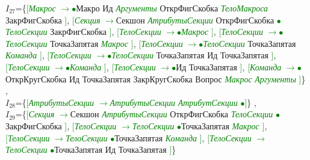 \documentclass[a0]{a0poster}
\begin{document}
$I_{27}$=\{\textcolor{Green}{[}\textcolor{Green}{\textit{Макрос}} \textcolor{Green}{$\to$}\textcolor{Green}{$\bullet$}Макро Ид \textcolor{Green}{\textit{Аргументы}} ОткрФигСкобка \textcolor{Green}{\textit{ТелоМакроса}} ЗакрФигСкобка \textcolor{Green}{]}, \textcolor{Green}{[}\textcolor{Green}{\textit{Секция}} \textcolor{Green}{$\to$}Секшон \textcolor{Green}{\textit{АтрибутыСекции}} ОткрФигСкобка \textcolor{Green}{$\bullet$}\textcolor{Green}{\textit{ТелоСекции}} ЗакрФигСкобка \textcolor{Green}{]}, \textcolor{Green}{[}\textcolor{Green}{\textit{ТелоСекции}} \textcolor{Green}{$\to$}\textcolor{Green}{$\bullet$}\textcolor{Green}{\textit{Макрос}} \textcolor{Green}{]}, \textcolor{Green}{[}\textcolor{Green}{\textit{ТелоСекции}} \textcolor{Green}{$\to$}\textcolor{Green}{$\bullet$}\textcolor{Green}{\textit{ТелоСекции}} ТочкаЗапятая \textcolor{Green}{\textit{Макрос}} \textcolor{Green}{]}, \textcolor{Green}{[}\textcolor{Green}{\textit{ТелоСекции}} \textcolor{Green}{$\to$}\textcolor{Green}{$\bullet$}\textcolor{Green}{\textit{ТелоСекции}} ТочкаЗапятая \textcolor{Green}{\textit{Команда}} \textcolor{Green}{]}, \textcolor{Green}{[}\textcolor{Green}{\textit{ТелоСекции}} \textcolor{Green}{$\to$}\textcolor{Green}{$\bullet$}\textcolor{Green}{\textit{ТелоСекции}} ТочкаЗапятая Ид ТочкаЗапятая \textcolor{Green}{]}, \textcolor{Green}{[}\textcolor{Green}{\textit{ТелоСекции}} \textcolor{Green}{$\to$}\textcolor{Green}{$\bullet$}\textcolor{Green}{\textit{Команда}} \textcolor{Green}{]}, \textcolor{Green}{[}\textcolor{Green}{\textit{ТелоСекции}} \textcolor{Green}{$\to$}\textcolor{Green}{$\bullet$}Ид ТочкаЗапятая \textcolor{Green}{]}, \textcolor{Green}{[}\textcolor{Green}{\textit{Команда}} \textcolor{Green}{$\to$}\textcolor{Green}{$\bullet$}ОткрКругСкобка Ид ТочкаЗапятая ЗакрКругСкобка Вопрос \textcolor{Green}{\textit{Макрос}} \textcolor{Green}{\textit{Аргументы}} \textcolor{Green}{]}\}
,\\
$I_{28}$=\{\textcolor{Green}{[}\textcolor{Green}{\textit{АтрибутыСекции}} \textcolor{Green}{$\to$}\textcolor{Green}{\textit{АтрибутыСекции}} \textcolor{Green}{\textit{АтрибутСекции}} \textcolor{Green}{$\bullet$}\textcolor{Green}{]}\}
,\\
$I_{29}$=\{\textcolor{Green}{[}\textcolor{Green}{\textit{Секция}} \textcolor{Green}{$\to$}Секшон \textcolor{Green}{\textit{АтрибутыСекции}} ОткрФигСкобка \textcolor{Green}{\textit{ТелоСекции}} \textcolor{Green}{$\bullet$}ЗакрФигСкобка \textcolor{Green}{]}, \textcolor{Green}{[}\textcolor{Green}{\textit{ТелоСекции}} \textcolor{Green}{$\to$}\textcolor{Green}{\textit{ТелоСекции}} \textcolor{Green}{$\bullet$}ТочкаЗапятая \textcolor{Green}{\textit{Макрос}} \textcolor{Green}{]}, \textcolor{Green}{[}\textcolor{Green}{\textit{ТелоСекции}} \textcolor{Green}{$\to$}\textcolor{Green}{\textit{ТелоСекции}} \textcolor{Green}{$\bullet$}ТочкаЗапятая \textcolor{Green}{\textit{Команда}} \textcolor{Green}{]}, \textcolor{Green}{[}\textcolor{Green}{\textit{ТелоСекции}} \textcolor{Green}{$\to$}\textcolor{Green}{\textit{ТелоСекции}} \textcolor{Green}{$\bullet$}ТочкаЗапятая Ид ТочкаЗапятая \textcolor{Green}{]}\}
\end{document}
